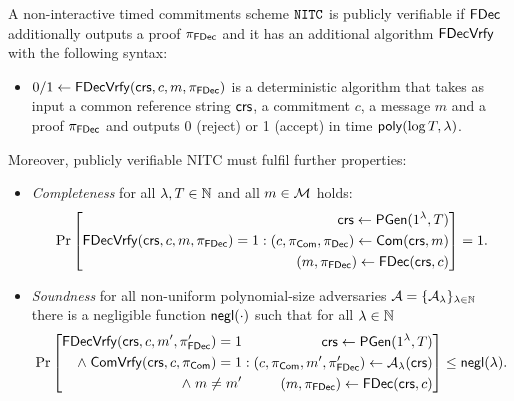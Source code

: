 \begin{definition}
\label{def:nitc_pubver}
A non-interactive timed commitments scheme $\mathtt{NITC}$ is publicly verifiable if $\mathsf{FDec}$ additionally outputs a proof $\pi_{\mathsf{FDec}}$ and it has an additional algorithm $\mathsf{FDecVrfy}$ with the following syntax:
\begin{itemize}
\item $0/1 \leftarrow \mathsf{FDecVrfy}(\mathsf{crs}, c, m, \pi_{\mathsf{FDec}})$ is a deterministic algorithm that takes as input a common reference string $\mathsf{crs}$, a commitment $c$, a message $m$ and a proof $\pi_{\mathsf{FDec}}$ and outputs 0 (reject) or 1 (accept) in time $\mathsf{poly}(\log T, \lambda)$.
\end{itemize}

Moreover, publicly verifiable NITC must fulfil further properties:
\begin{itemize}
\item \emph{Completeness} for all $\lambda, T \in \mathbb{N}$ and all $m \in \mathcal{M}$ holds:
\[\Pr\left[
\begin{aligned}
\mathsf{FDecVrfy}(\mathsf{crs}, c, m, \pi_{\mathsf{FDec}})=1
\end{aligned}
: 
\begin{aligned}
      \mathsf{crs} \leftarrow \mathsf{PGen}(1{^{\lambda}}, T) \\
      (c, \pi_{\mathsf{Com}}, \pi_{\mathsf{Dec}}) \leftarrow \mathsf{Com}(\mathsf{crs}, m) \\
      (m, \pi_{\mathsf{FDec}}) \leftarrow \mathsf{FDec}(\mathsf{crs}, c) \\
    \end{aligned}
\right] = 1.
\]
\item \emph{Soundness} for all non-uniform polynomial-size adversaries $\mathcal{A} = \{\mathcal{A}_{\lambda}\}_{\lambda \in \mathbb{N}}$ there is a negligible function $\mathsf{negl}(\cdot)$ such that for all $\lambda \in \mathbb{N}$
\[\Pr\left[
\begin{aligned}
\mathsf{FDecVrfy}(\mathsf{crs}, c, m', \pi_{\mathsf{FDec}}') = 1 \\
 \land \; \mathsf{ComVrfy}(\mathsf{crs}, c, \pi_{\mathsf{Com}}) = 1 \\
\land \; m \neq m' \\
\end{aligned}
: 
\begin{aligned}
      \mathsf{crs} \leftarrow \mathsf{PGen}(1{^{\lambda}}, T) \\
      (c, \pi_{\mathsf{Com}}, m', \pi_{\mathsf{FDec}}') \leftarrow \mathcal{A}_{\lambda}(\mathsf{crs}) \\
      (m,\pi_{\mathsf{FDec}}) \leftarrow \mathsf{FDec}(\mathsf{crs},c)
    \end{aligned}
\right] \leq \mathsf{negl}(\lambda).
\]
\end{itemize}

\end{definition}

